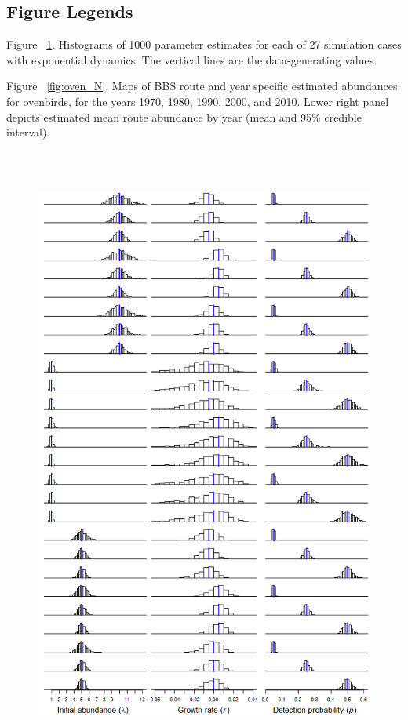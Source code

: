 \documentclass[12pt,english]{article}
\begin{document}
\begin{spacing}{1.9}
\begin{flushleft}
\clearpage

\section*{Figure Legends}
\noindent Figure ~\ref{fig:exp_hists}. Histograms of 1000 parameter estimates for each of 27
simulation cases with exponential dynamics. The vertical lines are the 
data-generating values.

%

\noindent Figure ~\ref{fig:oven_N}. Maps of BBS route and year specific estimated 
abundances for ovenbirds, for the years 1970, 1980, 1990, 2000, and 2010.  
Lower right panel depicts estimated mean route abundance by year
(mean and 95\% credible interval).

\begin{figure}
\caption{}
  \centering
  \includegraphics[height=8in]{figs/exp_hists}
\label{fig:exp_hists}
\end{figure}


\end{flushleft}
\end{spacing}
\end{document}
